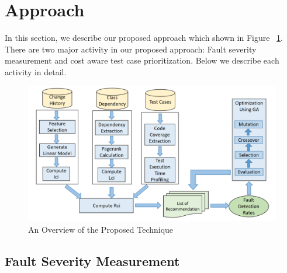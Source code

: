 \section{Approach}
\label{sec:method}

In this section, we describe our proposed approach which shown in 
Figure ~\ref{fig:workflow}.
There are two major activity in our proposed approach: 
Fault severity measurement and cost aware test case prioritization. 
Below we describe each activity in detail. 

\begin{figure}[!hb]
	\centering
	\includegraphics[width=0.75\linewidth]{./workflow4.png}
	\vspace*{3pt}
	\caption{An Overview of the Proposed Technique}
	\label{fig:workflow}
\end{figure} 

\subsection{Fault Severity Measurement}




